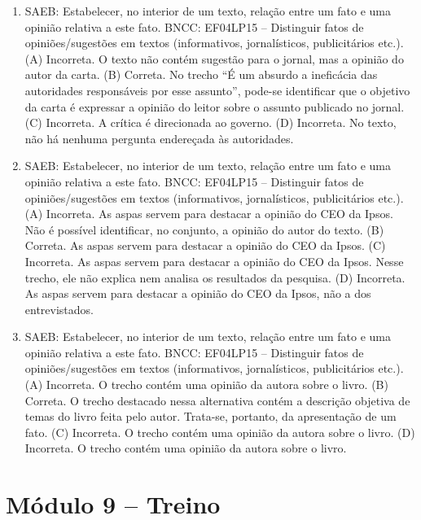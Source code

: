 \begin{enumerate}
\item
SAEB: Estabelecer, no interior de um texto, relação entre um fato e
uma opinião relativa a este fato.
BNCC: EF04LP15 -- Distinguir fatos de opiniões/sugestões em textos
(informativos, jornalísticos, publicitários etc.).
(A)  Incorreta. O texto não contém sugestão para o jornal, mas a
opinião do autor da carta.
(B)  Correta. No trecho ``É um absurdo a ineficácia das autoridades
responsáveis por esse assunto'', pode-se identificar que o objetivo da
carta é expressar a opinião do leitor sobre o assunto publicado no jornal.
(C)  Incorreta. A crítica é direcionada ao governo.
(D)  Incorreta. No texto, não há nenhuma pergunta endereçada às autoridades.

\item
SAEB: Estabelecer, no interior de um texto, relação entre um fato e
uma opinião relativa a este fato.
BNCC: EF04LP15 -- Distinguir fatos de opiniões/sugestões em textos
(informativos, jornalísticos, publicitários etc.).
(A) Incorreta. As aspas servem para destacar a opinião do CEO da Ipsos. 
Não é possível identificar, no conjunto, a opinião do autor do texto.  
(B) Correta. As aspas servem para destacar a opinião do CEO da Ipsos.
(C) Incorreta. As aspas servem para destacar a opinião do CEO da Ipsos.
Nesse trecho, ele não explica nem analisa os resultados da pesquisa.
(D) Incorreta. As aspas servem para destacar a opinião do CEO da Ipsos, não
a dos entrevistados.

\item
SAEB: Estabelecer, no interior de um texto, relação entre um fato e
uma opinião relativa a este fato.
BNCC: EF04LP15 -- Distinguir fatos de opiniões/sugestões em textos
(informativos, jornalísticos, publicitários etc.).
(A) Incorreta. O trecho contém uma opinião da autora sobre o livro.
(B) Correta. O trecho destacado nessa alternativa contém a descrição
objetiva de temas do livro feita pelo autor. Trata-se, portanto, da apresentação de 
um fato. 
(C) Incorreta. O trecho contém uma opinião da autora sobre o livro.
(D) Incorreta. O trecho contém uma opinião da autora sobre o livro.
\end{enumerate}

\section*{Módulo 9 – Treino}

